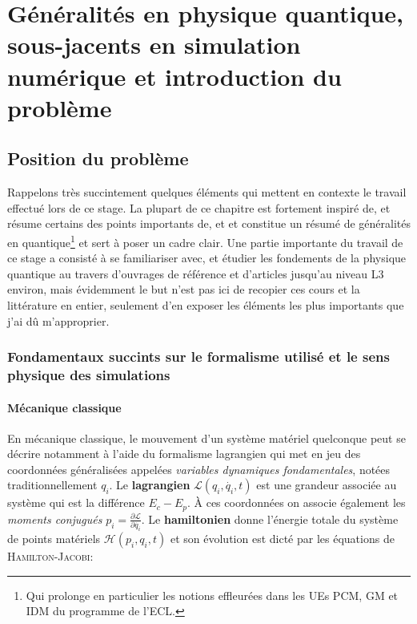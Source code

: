 \documentclass[svgnames,dvipsnames,a4paper,10pt,french]{report}
\begin{document}
\chapter{Généralités en physique quantique, sous-jacents en simulation numérique et introduction du problème}


\section{Position du problème}
Rappelons très succintement quelques éléments qui mettent en contexte le travail effectué lors de ce stage. La plupart de ce chapitre est fortement inspiré de, et résume certains des points importants de, \cite{cohen-tannoudji_mecanique_2021} et \cite{cances_introduction_2021} et constitue un résumé de généralités en quantique\footnote{Qui prolonge en particulier les notions effleurées dans les  UEs PCM, GM et IDM du programme de l'ECL.} et sert à poser un cadre clair. Une partie importante du travail de ce stage a consisté à se familiariser avec, et étudier les fondements de la physique quantique au travers d'ouvrages de référence et d'articles jusqu'au niveau L3 environ, mais évidemment le but n'est pas ici de recopier ces cours et la littérature en entier, seulement d'en exposer les éléments les plus importants que j'ai dû m'approprier.


\subsection{Fondamentaux succints sur le formalisme utilisé et le sens physique des simulations}


\subsubsection{Mécanique classique}
En mécanique classique, le mouvement d'un système matériel quelconque peut se décrire notamment à l'aide du formalisme lagrangien qui met en jeu des coordonnées généralisées appelées \emph{variables dynamiques fondamentales}, notées traditionnellement $q_i$. Le \textbf{lagrangien} $\mathcal{L}(q_i,\dot{q_i},t)$ est une grandeur associée au système qui est la différence $E_c-E_p$. À ces coordonnées on associe également les \emph{moments conjugués} $p_i = \frac{\partial \mathcal{L}}{\partial \dot{q_i}}$. Le \textbf{hamiltonien} donne l'énergie totale du système de points matériels $\mathcal{H}(p_i,q_i,t)$ et son évolution est dicté par les équations de \textsc{Hamilton-Jacobi}:
\end{document}
